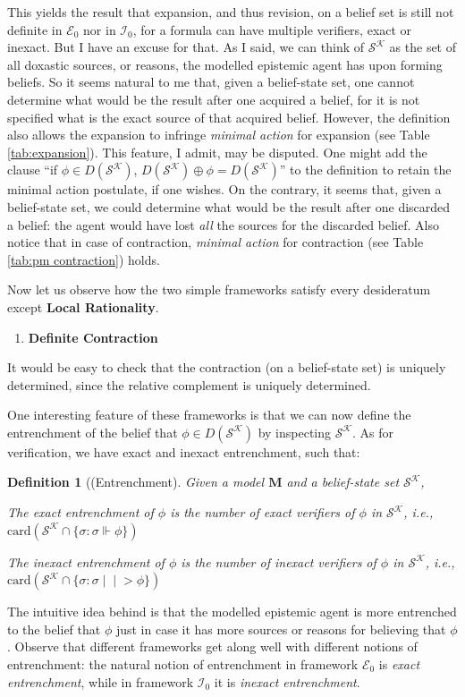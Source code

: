 \documentclass[12pt]{article}
\newtheorem{definition}{Definition}[section]
\newcommand{\ver}{\Vdash}
\newcommand{\inever}{\mid \! \mid \!\!>}
\newcommand{\SK}{\mathcal{S}^\mathcal{K}}
\begin{document}
This yields the result that expansion, and thus revision, on a belief set is still not definite in $\mathcal{E}_0$ nor in $\mathcal{I}_0$, for a formula can have multiple verifiers, exact or inexact. But I have an excuse for that. As I said, we can think of $\SK$ as the set of all doxastic sources, or reasons, the modelled epistemic agent has upon forming beliefs. So it seems natural to me that, given a belief-state set, one cannot determine what would be the result after one acquired a belief, for it is not specified what is the exact source of that acquired belief. However, the definition also allows the expansion to infringe \textit{minimal action} for expansion (see Table \ref{tab:expansion}). This feature, I admit, may be disputed. One might add the clause ``if $\phi \in D(\SK)$, $D(\SK) \oplus \phi = D(\SK)$'' to the definition to retain the minimal action postulate, if one wishes. On the contrary, it seems that, given a belief-state set, we could determine what would be the result after one discarded a belief: the agent would have lost \textit{all} the sources for the discarded belief. Also notice that in case of contraction, \textit{minimal action} for contraction (see Table \ref{tab:pm contraction}) holds. 
\par
Now let us observe how the two simple frameworks satisfy every desideratum except \textbf{Local Rationality}. 
\begin{enumerate}
    \item[(D1)] \textbf{Definite Contraction}
\end{enumerate}
It would be easy to check that the contraction (on a belief-state set) is uniquely determined, since the relative complement is uniquely determined. 
\par
One interesting feature of these frameworks is that we can now define the entrenchment of the belief that $\phi \in D(\SK)$ by inspecting $\SK$. As for verification, we have exact and inexact entrenchment, such that:
\begin{definition}[(Entrenchment] Given a model $\bm{M}$ and a belief-state set $\SK$, 
    \par
    The exact entrenchment of $\phi$ is the number of exact verifiers of $\phi$ in $\SK$, i.e., $\text{card}(\SK \cap \{\sigma: \sigma \ver \phi\})$ \par
    The inexact entrenchment of $\phi$ is the number of inexact verifiers of $\phi$ in $\SK$, i.e., $\text{card}(\SK \cap \{\sigma: \sigma \inever \phi \})$
\end{definition}
The intuitive idea behind is that the modelled epistemic agent is more entrenched to the belief that $\phi$ just in case it has more sources or reasons for believing that $\phi$. Observe that different frameworks get along well with different notions of entrenchment: the natural notion of entrenchment in framework $\mathcal{E}_0$ is \textit{exact entrenchment}, while in framework $\mathcal{I}_0$ it is \textit{inexact entrenchment}.
\end{document}
